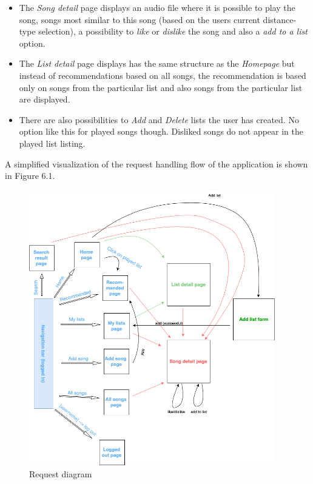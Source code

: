 \begin{itemize}
    \item The \textit{Song detail} page displays an audio file where it is possible to play the song, songs most similar to this song (based on the users current distance-type selection), a possibility to \textit{like} or \textit{dislike} the song and also a \textit{add to a list} option.
    \item The \textit{List detail} page displays has the same structure as the \textit{Homepage} but instead of recommendations based on all songs, the recommendation is based only on songs from the particular list and also songs from the particular list are displayed.
    \item There are also possibilities to \textit{Add} and \textit{Delete} lists the user has created. No option like this for played songs though. Disliked songs do not appear in the played list listing. 
\end{itemize}
A simplified visualization of the request handling flow of the application is shown in Figure 6.1.

\begin{figure}[h]
    \centering
	\includegraphics[height=120mm]{./img/analysis_diagram.png}
	\caption{Request diagram}
	\label{fig:analysis}
\end{figure}

